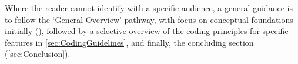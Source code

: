 Where the reader cannot identify with a specific audience, a general guidance is to follow the `General Overview' pathway, with focus on conceptual foundations initially (), followed by a selective overview of the coding principles for specific features in \cref{sec:CodingGuidelines}, and finally, the concluding section (\cref{sec:Conclusion}). 

\newpage
